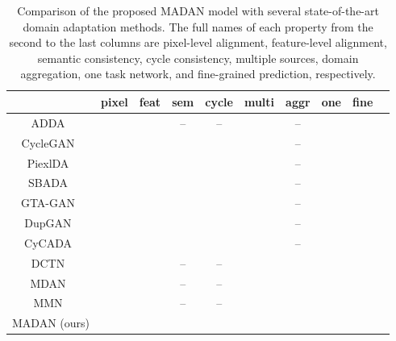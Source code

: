 \documentclass{article}
\newcommand{\cmark}{\textcolor{ForestGreen}{\ding{51}}}\newcommand{\xmark}{\textcolor{Maroon}{\ding{55}}}
\begin{document}
\begin{table*}[!t]
\centering\small \caption{Comparison of the proposed MADAN model with several state-of-the-art domain adaptation methods. The full names of each property from the second to the last columns are pixel-level alignment, feature-level alignment, semantic consistency, cycle consistency, multiple sources, domain aggregation, one task network, and fine-grained prediction, respectively.}
\begin{tabular}
{c c c c c c c c c c}
\toprule
& pixel & feat & sem & cycle & multi & aggr & one & fine \\
\hline
ADDA~\cite{tzeng2017adversarial} & \xmark  & \cmark & -- &  -- & \xmark  & -- & \cmark & \cmark  \\
CycleGAN~\cite{zhu2017unpaired} & \cmark  & \xmark & \xmark &  \cmark & \xmark  & -- & \cmark & \xmark  \\
PiexlDA~\cite{bousmalis2017unsupervised} & \cmark  & \xmark & \xmark &  \xmark & \xmark  & -- & \cmark & \cmark  \\
SBADA~\cite{russo2018source} & \cmark  & \xmark & \cmark &  \cmark & \xmark  & -- & \cmark & \xmark  \\
GTA-GAN~\cite{sankaranarayanan2018generate} & \cmark  & \cmark & \xmark &  \xmark & \xmark  & -- & \cmark & \xmark  \\
DupGAN~\cite{hu2018duplex} & \cmark  & \cmark & \cmark &  \xmark & \xmark  & -- & \cmark & \xmark  \\
CyCADA~\cite{hoffman2018cycada} & \cmark  & \cmark & \cmark &  \cmark & \xmark  & -- & \cmark & \cmark  \\
\hline
DCTN~\cite{xu2018deep} & \xmark  & \cmark & -- &  -- & \cmark  & \xmark & \xmark & \xmark  \\
MDAN~\cite{zhao2018adversarial} & \xmark  & \cmark &  -- &  -- & \cmark  & \xmark & \cmark & \xmark  \\
MMN~\cite{peng2018moment} & \xmark  & \cmark &  -- &  -- & \cmark  & \xmark & \xmark & \xmark  \\
MADAN (ours) & \cmark  & \cmark &  \cmark &  \cmark & \cmark  & \cmark & \cmark & \cmark  \\
\bottomrule
\end{tabular}
\label{tab:propertyComparison}
\end{table*}
\end{document}
